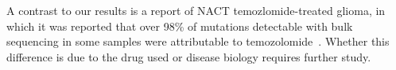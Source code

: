 \documentclass[linenumbers]{bmcart}
\begin{document}










A contrast to our results is a report of NACT temozlomide-treated glioma, in which it was reported that over 98\% of mutations detectable with bulk sequencing in some samples were attributable to temozolomide~\cite{Johnson_2013}. Whether this difference is due to the drug used or disease biology requires further study.
\end{document}
